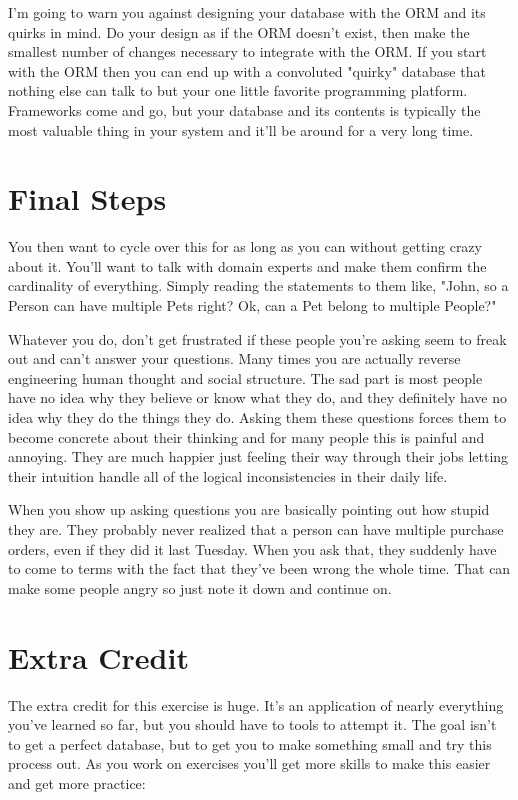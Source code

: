 I'm going to warn you against designing your database with the ORM and its quirks in mind.  Do your
design as if the ORM doesn't exist, then make the smallest number of changes necessary to integrate
with the ORM.  If you start with the ORM then you can end up with a convoluted "quirky" database that
nothing else can talk to but your one little favorite programming platform.  Frameworks come and
go, but your database and its contents is typically the most valuable thing in your system and
it'll be around for a very long time.

\section{Final Steps}

You then want to cycle over this for as long as you can without getting crazy about it.  You'll want
to talk with domain experts and make them confirm the cardinality of everything.  Simply reading the
statements to them like, "John, so a Person can have multiple Pets right?  Ok, can a Pet belong
to multiple People?"

Whatever you do, don't get frustrated if these people you're asking seem to freak out and can't answer
your questions.  Many times you are actually reverse engineering human thought and social structure.  The sad
part is most people have no idea why they believe or know what they do, and they definitely have no
idea why they do the things they do.  Asking them these questions forces them to become concrete
about their thinking and for many people this is painful and annoying.  They are much happier just
feeling their way through their jobs letting their intuition handle all of the logical inconsistencies
in their daily life.

When you show up asking questions you are basically pointing out how stupid they are.  They probably
never realized that a person can have multiple purchase orders, even if they did it last Tuesday.  When
you ask that, they suddenly have to come to terms with the fact that they've been wrong the whole time.
That can make some people angry so just note it down and continue on.

\section{Extra Credit}

The extra credit for this exercise is huge.  It's an application of nearly everything
you've learned so far, but you should have to tools to attempt it.  The goal isn't
to get a perfect database, but to get you to make something small and try this process out.  As
you work on exercises you'll get more skills to make this easier and get more practice:


